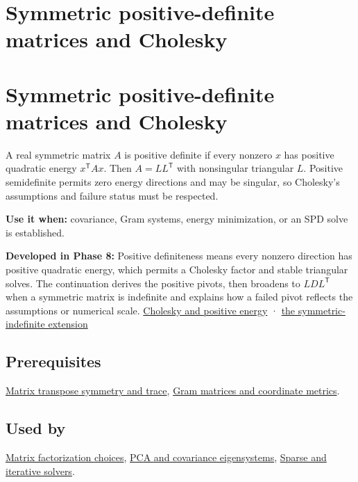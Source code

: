 \hypertarget{appendix-50d2ea3c9b26}{}
\section*{Symmetric positive-definite matrices and Cholesky}
\section{Symmetric positive-definite matrices and Cholesky}\label{symmetric-positive-definite-matrices-and-cholesky}

A real symmetric matrix \(A\) is positive definite if every nonzero \(x\) has positive quadratic energy \(x^\mathsf T A x\). Then \(A=LL^\mathsf T\) with nonsingular triangular \(L\). Positive semidefinite permits zero energy directions and may be singular, so Cholesky's assumptions and failure status must be respected.

\textbf{Use it when:} covariance, Gram systems, energy minimization, or an SPD solve is established.

\textbf{Developed in Phase 8:} Positive definiteness means every nonzero direction has positive quadratic energy, which permits a Cholesky factor and stable triangular solves. The continuation derives the positive pivots, then broadens to \(LDL^\mathsf T\) when a symmetric matrix is indefinite and explains how a failed pivot reflects the assumptions or numerical scale. \href{Continuous\%20Notes/Computing\%20Foundations\%20-\%20From\%20Bits\%20to\%20C++\%20and\%20Systems\%20APIs\#Positive\%20definiteness\%20is\%20a\%20structural\%20promise}{Cholesky and positive energy} · \href{Continuous\%20Notes/Computing\%20Foundations\%20-\%20From\%20Bits\%20to\%20C++\%20and\%20Systems\%20APIs\#LDLT\%20reaches\%20symmetric\%20indefinite\%20matrices}{the symmetric-indefinite extension}

\subsection{Prerequisites}\label{prerequisites}

\hyperref[appendix-175ca5ff874d]{Matrix transpose symmetry and trace}, \hyperref[appendix-3b863809f82a]{Gram matrices and coordinate metrics}.

\subsection{Used by}\label{used-by}

\hyperref[appendix-221a483bec2d]{Matrix factorization choices}, \hyperref[appendix-ad175ef3c5bf]{PCA and covariance eigensystems}, \hyperref[appendix-67c87a3d9e94]{Sparse and iterative solvers}.

